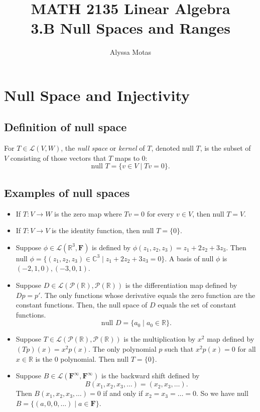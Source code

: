 \documentclass[11pt]{article}
\title{\textbf{MATH 2135 Linear Algebra} \\ 3.B Null Spaces and Ranges}
\author{Alyssa Motas}
\begin{document}
    \maketitle

    \pagebreak

    \tableofcontents

    \pagebreak

    \section{Null Space and Injectivity}

    \subsection{Definition of null space}

    For \(T \in \mathcal{L}(V,W)\), the \emph{null space} or \emph{kernel} of $T$, denoted null $T$, is the subset of $V$ consisting of those vectors that $T$ maps to 0: \[\text{null } T = \{v \in V \mid Tv = 0\}.\]

    \subsection{Examples of null spaces}

    \begin{itemize}
        \item If \(T:V \rightarrow W\) is the zero map where \(Tv = 0\) for every \(v \in V\), then null \(T = V\). 
        \item If \(T:V \rightarrow V\) is the identity function, then null \(T = \{0\}\). 
        \item Suppose \(\phi \in \mathcal{L}(\mathbb{R}^3, \textbf{F})\) is defined by \(\phi (z_1, z_2, z_3) = z_1 + 2z_2 + 3z_3\). Then null \(\phi = \{(z_1, z_2, z_3) \in \mathbb{C}^3 \mid z_1 + 2 z_2 + 3 z_3 = 0\}.\) A basis of null \(\phi\) is \((-2,1,0), (-3,0,1)\). 
        \item Suppose \(D \in \mathcal{L}(\mathcal{P}(\mathbb{R}), \mathcal{P}(\mathbb{R}))\) is the differentiation map defined by \(Dp = p'\). The only functions whose derivative equals the zero function are the constant functions. Then, the null space of $D$ equals the set of constant functions. \[\text{null } D = \{ a_0 \mid a_0 \in \mathbb{R} \}.\]
        \item Suppose \(T \in \mathcal{L}(\mathcal{P}(\mathbb{R}), \mathcal{P}(\mathbb{R}))\) is the multiplication by \(x^2\) map defined by \((Tp)(x) = x^2 p(x)\). The only polynomial $p$ such that \(x^2 p(x) = 0\) for all \(x \in \mathbb{R}\) is the 0 polynomial. Then null \(T = \{0\}\). 
        \item Suppose \(B \in \mathcal{L}(\textbf{F}^{\infty}, \textbf{F}^{\infty})\) is the backward shift defined by \[ B(x_1, x_2, x_3, \dots) = (x_2, x_3, \dots).\] Then \(B(x_1,x_2,x_3,\dots) = 0\) if and only if \(x_2 = x_3 = \dots = 0\). So we have null \(B = \{ (a,0,0,\dots) \mid a \in \textbf{F} \}\). 
    \end{itemize}
\end{document}
